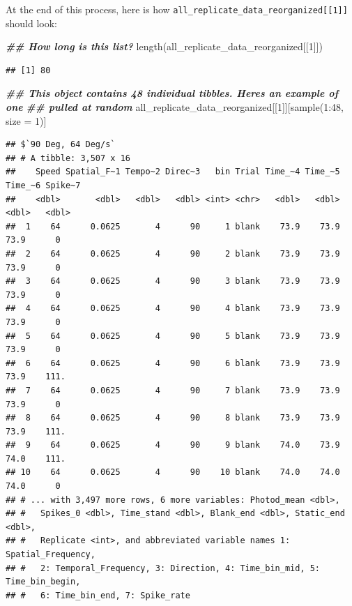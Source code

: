 \documentclass[
]{book}
\newenvironment{Shaded}{\begin{snugshade}}{\end{snugshade}}
\newcommand{\AttributeTok}[1]{\textcolor[rgb]{0.77,0.63,0.00}{#1}}
\newcommand{\DecValTok}[1]{\textcolor[rgb]{0.00,0.00,0.81}{#1}}
\newcommand{\DocumentationTok}[1]{\textcolor[rgb]{0.56,0.35,0.01}{\textbf{\textit{#1}}}}
\newcommand{\FunctionTok}[1]{\textcolor[rgb]{0.00,0.00,0.00}{#1}}
\newcommand{\NormalTok}[1]{#1}
\newcommand{\SpecialCharTok}[1]{\textcolor[rgb]{0.00,0.00,0.00}{#1}}
\begin{document}
At the end of this process, here is how \texttt{all\_replicate\_data\_reorganized{[}{[}1{]}{]}}
should look:

\begin{Shaded}
\begin{Highlighting}[]
\DocumentationTok{\#\# How long is this list?}
\FunctionTok{length}\NormalTok{(all\_replicate\_data\_reorganized[[}\DecValTok{1}\NormalTok{]])}
\end{Highlighting}
\end{Shaded}

\begin{verbatim}
## [1] 80
\end{verbatim}

\begin{Shaded}
\begin{Highlighting}[]
\DocumentationTok{\#\# This object contains 48 individual tibbles. Here\textquotesingle{}s an example of one}
\DocumentationTok{\#\# pulled at random}
\NormalTok{all\_replicate\_data\_reorganized[[}\DecValTok{1}\NormalTok{]][}\FunctionTok{sample}\NormalTok{(}\DecValTok{1}\SpecialCharTok{:}\DecValTok{48}\NormalTok{, }\AttributeTok{size =} \DecValTok{1}\NormalTok{)]}
\end{Highlighting}
\end{Shaded}

\begin{verbatim}
## $`90 Deg, 64 Deg/s`
## # A tibble: 3,507 x 16
##    Speed Spatial_F~1 Tempo~2 Direc~3   bin Trial Time_~4 Time_~5 Time_~6 Spike~7
##    <dbl>       <dbl>   <dbl>   <dbl> <int> <chr>   <dbl>   <dbl>   <dbl>   <dbl>
##  1    64      0.0625       4      90     1 blank    73.9    73.9    73.9      0 
##  2    64      0.0625       4      90     2 blank    73.9    73.9    73.9      0 
##  3    64      0.0625       4      90     3 blank    73.9    73.9    73.9      0 
##  4    64      0.0625       4      90     4 blank    73.9    73.9    73.9      0 
##  5    64      0.0625       4      90     5 blank    73.9    73.9    73.9      0 
##  6    64      0.0625       4      90     6 blank    73.9    73.9    73.9    111.
##  7    64      0.0625       4      90     7 blank    73.9    73.9    73.9      0 
##  8    64      0.0625       4      90     8 blank    73.9    73.9    73.9    111.
##  9    64      0.0625       4      90     9 blank    74.0    73.9    74.0    111.
## 10    64      0.0625       4      90    10 blank    74.0    74.0    74.0      0 
## # ... with 3,497 more rows, 6 more variables: Photod_mean <dbl>,
## #   Spikes_0 <dbl>, Time_stand <dbl>, Blank_end <dbl>, Static_end <dbl>,
## #   Replicate <int>, and abbreviated variable names 1: Spatial_Frequency,
## #   2: Temporal_Frequency, 3: Direction, 4: Time_bin_mid, 5: Time_bin_begin,
## #   6: Time_bin_end, 7: Spike_rate
\end{verbatim}
\end{document}
